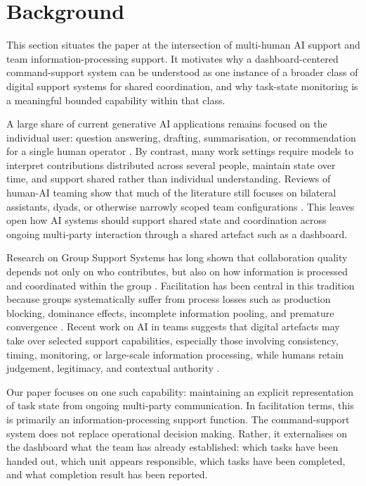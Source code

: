 \section{Background}
\label{sec:background}

This section situates the paper at the intersection of multi-human AI support and team information-processing support. It motivates why a dashboard-centered command-support system can be understood as one instance of a broader class of digital support systems for shared coordination, and why task-state monitoring is a meaningful bounded capability within that class.

A large share of current generative AI applications remains focused on the individual user: question answering, drafting, summarisation, or recommendation for a single human operator \citep{Maedche2019,Nah2023}. By contrast, many work settings require models to interpret contributions distributed across several people, maintain state over time, and support shared rather than individual understanding. Reviews of human-AI teaming show that much of the literature still focuses on bilateral assistants, dyads, or otherwise narrowly scoped team configurations \citep{Lyons2021,ONeill2022,Anthony2023,Bankins2024}. This leaves open how AI systems should support shared state and coordination across ongoing multi-party interaction through a shared artefact such as a dashboard.

Research on Group Support Systems has long shown that collaboration quality depends not only on who contributes, but also on how information is processed and coordinated within the group \citep{Nunamaker1991,DennisValacich1993,DennisWixomVandenberg2001,Briggs2003}. Facilitation has been central in this tradition because groups systematically suffer from process losses such as production blocking, dominance effects, incomplete information pooling, and premature convergence \citep{StasserTitus1985,DennisValacich1993,Briggs2003}. Recent work on AI in teams suggests that digital artefacts may take over selected support capabilities, especially those involving consistency, timing, monitoring, or large-scale information processing, while humans retain judgement, legitimacy, and contextual authority \citep{Dellermann2019HI,Seeber2020,DennisLakhiwalSachdeva2023}.

Our paper focuses on one such capability: maintaining an explicit representation of task state from ongoing multi-party communication. In facilitation terms, this is primarily an information-processing support function. The command-support system does not replace operational decision making. Rather, it externalises on the dashboard what the team has already established: which tasks have been handed out, which unit appears responsible, which tasks have been completed, and what completion result has been reported.

